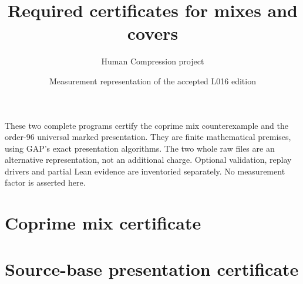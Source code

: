 \documentclass[a4paper,10pt]{article}
\title{Required certificates for mixes and covers}\author{Human Compression project}
\date{Measurement representation of the accepted L016 edition}
\begin{document}
\maketitle
These two complete programs certify the coprime mix counterexample and the
order-96 universal marked presentation.
They are finite mathematical premises, using GAP's exact presentation algorithms.
The two whole raw files are an alternative representation, not an additional charge.
Optional validation, replay drivers and partial Lean evidence are inventoried
separately. No measurement factor is asserted here.
\section*{Coprime mix certificate}
\newpage\section*{Source-base presentation certificate}
\end{document}
